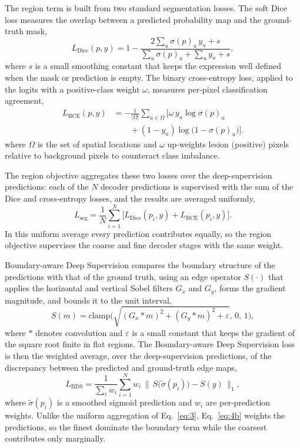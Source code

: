 The region term is built from two standard segmentation losses. The soft Dice loss measures the overlap between a predicted probability map and the ground-truth mask,
\begin{equation}
L_{\mathrm{Dice}}(p,y) = 1 - \frac{2\sum_{u}\sigma(p)_u\,y_u + s}{\sum_{u}\sigma(p)_u + \sum_{u}y_u + s}, \tag{1}
\label{eq:1}
\end{equation}
where $s$ is a small smoothing constant that keeps the expression well defined when the mask or prediction is empty. The binary cross-entropy loss, applied to the logits with a positive-class weight $\omega$, measures per-pixel classification agreement,
\begin{equation}
\begin{aligned}
L_{\mathrm{BCE}}(p,y)
&=
-\frac{1}{|\Omega|}
\sum_{u\in\Omega}
\Big[
\omega\,y_u\log\sigma(p)_u
\\
&\qquad
+
(1-y_u)\log\big(1-\sigma(p)_u\big)
\Big].
\end{aligned}
\label{eq:2}
\end{equation}
where $\Omega$ is the set of spatial locations and $\omega$ up-weights lesion (positive) pixels relative to background pixels to counteract class imbalance.

The region objective aggregates these two losses over the deep-supervision predictions: each of the $N$ decoder predictions is supervised with the sum of the Dice and cross-entropy losses, and the results are averaged uniformly,
\begin{equation}
L_{\mathrm{seg}} = \frac{1}{N}\sum_{i=1}^{N}\Big[L_{\mathrm{Dice}}(p_i,y) + L_{\mathrm{BCE}}(p_i,y)\Big]. \tag{3}
\label{eq:3}
\end{equation}
In this uniform average every prediction contributes equally, so the region objective supervises the coarse and fine decoder stages with the same weight.

Boundary-aware Deep Supervision compares the boundary structure of the predictions with that of the ground truth, using an edge operator $S(\cdot)$ that applies the horizontal and vertical Sobel filters $G_x$ and $G_y$, forms the gradient magnitude, and bounds it to the unit interval,
\begin{equation}
S(m) = \mathrm{clamp}\!\Big(\sqrt{(G_x * m)^2 + (G_y * m)^2 + \varepsilon},\,0,\,1\Big), \tag{4a}
\label{eq:4a}
\end{equation}
where $*$ denotes convolution and $\varepsilon$ is a small constant that keeps the gradient of the square root finite in flat regions. The Boundary-aware Deep Supervision loss is then the weighted average, over the deep-supervision predictions, of the discrepancy between the predicted and ground-truth edge maps,
\begin{equation}
L_{\mathrm{BDS}} = \frac{1}{\sum_{i}w_i}\sum_{i=1}^{N} w_i \,\big\lVert\, S\big(\tilde{\sigma}(p_i)\big) - S(y)\,\big\rVert_1, \tag{4b}
\label{eq:4b}
\end{equation}
where $\tilde{\sigma}(p_i)$ is a smoothed sigmoid prediction and $w_i$ are per-prediction weights. Unlike the uniform aggregation of Eq.~\eqref{eq:3}, Eq.~\eqref{eq:4b} weights the predictions, so the finest dominate the boundary term while the coarsest contributes only marginally.

